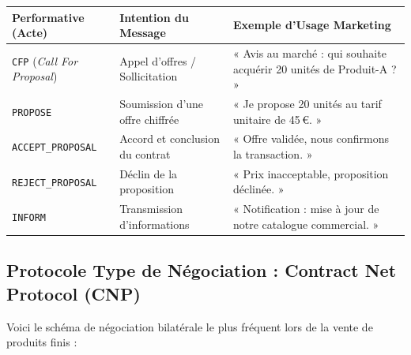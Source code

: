 \documentclass[11pt,a4paper]{article}
\begin{document}
\begin{center}
\small
\begin{tabularx}{\textwidth}{p{3.8cm} p{4.2cm} X}
\toprule
\textbf{Performative (Acte)} & \textbf{Intention du Message} & \textbf{Exemple d'Usage Marketing} \\
\midrule
\texttt{CFP} (\textit{Call For Proposal}) & Appel d'offres / Sollicitation & « Avis au marché : qui souhaite acquérir 20 unités de Produit-A ? » \\
\texttt{PROPOSE} & Soumission d'une offre chiffrée & « Je propose 20 unités au tarif unitaire de 45\,\euro. » \\
\texttt{ACCEPT\_PROPOSAL} & Accord et conclusion du contrat & « Offre validée, nous confirmons la transaction. » \\
\texttt{REJECT\_PROPOSAL} & Déclin de la proposition & « Prix inacceptable, proposition déclinée. » \\
\texttt{INFORM} & Transmission d'informations & « Notification : mise à jour de notre catalogue commercial. » \\
\bottomrule
\end{tabularx}
\end{center}

\subsection{Protocole Type de Négociation : Contract Net Protocol (CNP)}
Voici le schéma de négociation bilatérale le plus fréquent lors de la vente de produits finis :
\end{document}
